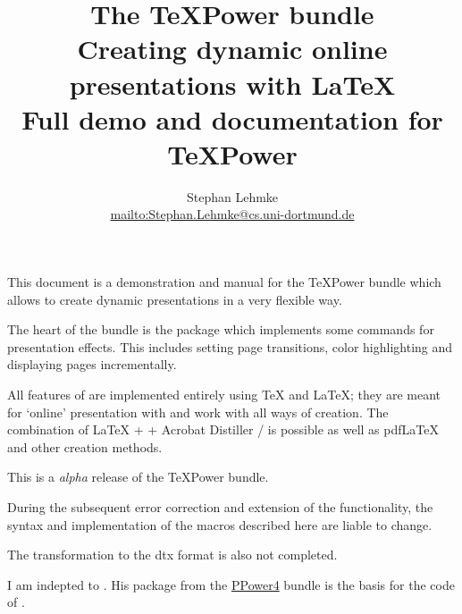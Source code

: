 %

\begin{slide}
%
%
  \title
  {%
    The \TeX Power bundle\\
    {%
      \normalfont
      Creating dynamic online presentations with \LaTeX\\
      Full demo and documentation for \TeX Power \tpversion%
      }%
    }

  \author{Stephan Lehmke\\\url{mailto:Stephan.Lehmke@cs.uni-dortmund.de}}

  \maketitle

  \newslide

  This document is a demonstration and manual for the \TeX Power bundle which allows to create dynamic
  presentations in a very flexible way.

  The heart of the bundle is the package  which implements some commands for presentation effects. This
  includes setting page transitions, color highlighting and displaying pages incrementally.

  All features of  are implemented entirely using \TeX{} and \LaTeX; they are meant for `online'
  presentation with  and work with all ways of 
  creation. The combination of \LaTeX{} +  + Acrobat Distiller /
   is possible as well as pdf\LaTeX{} and other  creation
  methods.

  \newslide

  This is a \emph{alpha} release of the \TeX Power bundle.

  During the subsequent error correction and extension of the functionality, the syntax and implementation of the macros
  described here are liable to change.

  The transformation to the dtx format is also not completed.

  \newslide

  I am indepted to \href{mailto:guntermann@iti.informatik.tu-darmstadt.de}{}. His package
  \href{http://www-sp.iti.informatik.tu-darmstadt.de/software/ppower4/pp4sty.zip}{} from the  \href{http://www-sp.iti.informatik.tu-darmstadt.de/software/ppower4/}{PPower4} bundle
  is the basis for the code of .


\end{slide}
